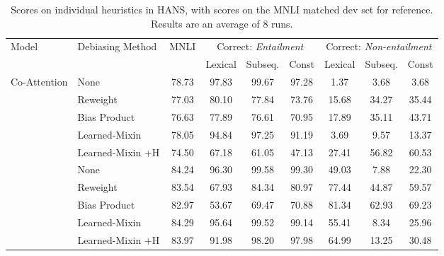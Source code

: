 \documentclass[11pt,a4paper]{article}
\begin{document}
\label{sect:fine-grained-hans}
\label{appendix:fine_grained_hans}
\begin{table*}[]
    \centering
    \tablefont
\begin{tabular}{llccccccc} \toprule
\multirow{2}{*}{Model} & \multirow{2}{*}{Debiasing Method} & \multirow{2}{*}{MNLI} & \multicolumn{3}{c}{Correct: \textit{Entailment}} & \multicolumn{3}{c}{Correct: \textit{Non-entailment}}\\
\cmidrule(r){4-6} \cmidrule(l){7-9}
 &  &  & Lexical & Subseq. & Const & Lexical & Subseq. & Const\\ \midrule
 \multirow{5}{*}{Co-Attention} & None & 78.73 & 97.83 & 99.67 & 97.28 & 1.37 & 3.68 & 3.68 \\
 & Reweight & 77.03 & 80.10 & 77.84 & 73.76 & 15.68 & 34.27 & 35.44 \\
 & Bias Product & 76.63 & 77.89 & 76.61 & 70.95 & 17.89 & 35.11 & 43.71 \\
 & Learned-Mixin & 78.05 & 94.84 & 97.25 & 91.19 & 3.69 & 9.57 & 13.37 \\
 & Learned-Mixin +H & 74.50 & 67.18 & 61.05 & 47.13 & 27.41 & 56.82 & 60.53 \\
\hdashline
\multirow{5}{*}{BERT} & None & 84.24 & 96.30 & 99.58 & 99.30 & 49.03 & 7.88 & 22.30 \\
 & Reweight & 83.54 & 67.93 & 84.34 & 80.97 & 77.44 & 44.87 & 59.57 \\
 & Bias Product & 82.97 & 53.67 & 69.47 & 70.88 & 81.34 & 62.93 & 69.23 \\
 & Learned-Mixin & 84.29 & 95.64 & 99.52 & 99.14 & 55.41 & 8.34 & 25.96 \\
 & Learned-Mixin +H & 83.97 & 91.98 & 98.20 & 97.98 & 64.99 & 13.25 & 30.48 \\
\bottomrule
\end{tabular}
    \caption{Scores on individual heuristics in HANS, with scores on the MNLI matched dev set for reference. Results are an average of 8 runs.}
    \label{tab:fine-grained-hans}
    
\end{table*}
\end{document}
